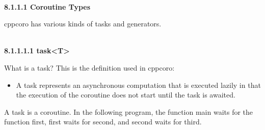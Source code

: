 \hspace*{\fill} \\ %
\noindent
\textbf{8.1.1.1\hspace{0.2cm} Coroutine Types}

cppcoro has various kinds of tasks and generators.

\hspace*{\fill} \\ %
\noindent
\textbf{8.1.1.1.1\hspace{0.2cm} task<T>}

What is a task? This is the definition used in cppcoro:

\begin{itemize}
\item 
A task represents an asynchronous computation that is executed lazily in that the execution of the coroutine does not start until the task is awaited.
\end{itemize}

A task is a coroutine. In the following program, the function main waits for the function first, first waits for second, and second waits for third.

